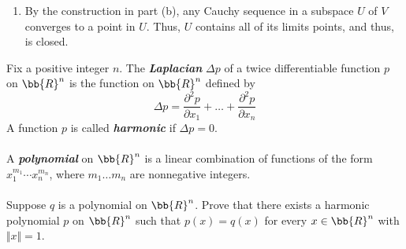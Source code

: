 \documentclass[12pt,letterpaper]{hmcpset}
\begin{document}
\begin{solution}
\begin{enumerate}
\[        \]\\
        Specifically, for any \( \varepsilon' > 0 \) there is some \( N \in \bb{N} \) such that for all \( n > N \)
        \[
        d(A_1 u_1 + \ldots + A_m u_m, a_{n, 1} u_1 + \ldots a_{n, m} u_m) < \varepsilon'.
        \]
        That is, \( \set{v_n} \) converges to \( A_1 u_1 + \ldots A_m u_m \).
        \item By the construction in part (b), any Cauchy sequence in a subspace $U$ of $V$ converges to a point in $U$. Thus, $U$ contains all of its limits points, and thus, is closed.
    \end{enumerate}
\end{solution}

\begin{problem}[30]
	Fix a positive integer $n$. The \textbf{\textit{Laplacian}} $\Delta p$ of a twice differentiable function $p$ on $\bb{R}^n$ is the function on $\bb{R}^n$ defined by
	\[
		\Delta p = \frac{\partial^2 p}{\partial x_1} + \ldots + \frac{\partial^2 p}{\partial x_n}
	\]
A function $p$ is called \textbf{\textit{harmonic}} if \( \Delta p = 0 \).\\\\
	A \textbf{\textit{polynomial}} on $\bb{R}^n$ is a linear combination of functions of the form \( x_1^{m_1} \cdots x_n^{m_n} \), where \( m_1 \ldots m_n \) are nonnegative integers.\\\\
	Suppose $q$ is a polynomial on $\bb{R}^n$. Prove that there exists a harmonic polynomial $p$ on $\bb{R}^n$ such that \( p(x) = q(x) \) for every \( x \in \bb{R}^n \) with \( \Vert x \Vert = 1 \).

\end{problem}
\end{document}
